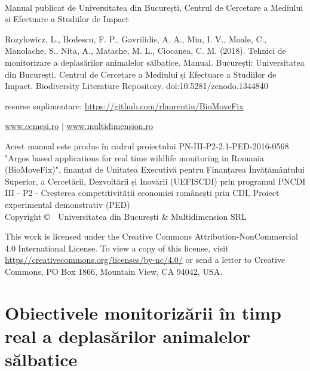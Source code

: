 \documentclass[11pt,onehalfspacing]{elife}
\begin{document}
\newpage
\begin{titlepage}
~\vfill
\setlength{\parindent}{0pt}
\setlength{\parskip}{\baselineskip}

\par {Manual publicat de Universitatea din București, Centrul de Cercetare a Mediului și Efectuare a Studiilor de Impact}

\par {Rozylowicz, L., Bodescu, F. P., Gavrilidis, A. A., Miu, I. V., Moale, C., Manolache, S., Nita, A., Matache, M. L., Ciocanea, C. M. (2018). Tehnici de monitorizare a deplasărilor animalelor sălbatice. Manual. București: Universitatea din București. Centrul de Cercetare a Mediului și Efectuare a Studiilor de Impact. Biodiversity Literature Repository. doi:10.5281/zenodo.1344840}

\par{resurse suplimentare: \url{https://github.com/rlaurentiu/BioMoveFix}}

\par{\url{www.ccmesi.ro} | \url{www.multidimension.ro}}\\

\par{Acest manual este produs în cadrul proiectului PN-III-P2-2.1-PED-2016-0568 "Argos based applications for real time wildlife monitoring in Romania (BioMoveFix)", finanțat de Unitatea Executivă pentru Finanțarea Învățământului Superior, a Cercetării, Dezvoltării și Inovării (UEFISCDI) prin programul PNCDI III - P2 - Creșterea competitivității economiei românești prin CDI, Proiect experimental demonstrativ (PED)}\\

Copyright \copyright\ \the\year~Universitatea din București \& Multidimension SRL\\

\par This work is licensed under the Creative Commons Attribution-NonCommercial 4.0 International License. To view a copy of this license, visit \url{https//creativecommons.org/licenses/by-nc/4.0/} or send a letter to Creative Commons, PO Box 1866, Mountain View, CA 94042, USA.

\par{}
\clearpage
\end{titlepage}

\tableofcontents
\clearpage
\section{Obiectivele monitorizării în timp real a deplasărilor animalelor sălbatice}
\end{document}
